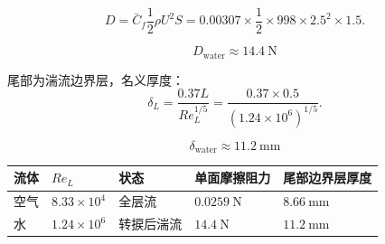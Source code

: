 ﻿\documentclass[11pt,a4paper]{ctexart}
\begin{document}
\[
D=\bar C_f\frac12\rho U^2S
=0.00307\times\frac12\times998\times2.5^2\times1.5.
\]

\[
\boxed{D_{\mathrm{water}}\approx14.4\ \mathrm{N}}
\]

尾部为湍流边界层，名义厚度：
\[
\delta_L=\frac{0.37L}{Re_L^{1/5}}
=\frac{0.37\times0.5}{(1.24\times10^6)^{1/5}}.
\]

\[
\boxed{\delta_{\mathrm{water}}\approx11.2\ \mathrm{mm}}
\]

\begin{center}
\begin{tabular}{lllll}
\toprule
流体 & \(Re_L\) & 状态 & 单面摩擦阻力 & 尾部边界层厚度\\
\midrule
空气 & \(8.33\times10^4\) & 全层流 & \(0.0259\ \mathrm{N}\) & \(8.66\ \mathrm{mm}\)\\
水 & \(1.24\times10^6\) & 转捩后湍流 & \(14.4\ \mathrm{N}\) & \(11.2\ \mathrm{mm}\)\\
\bottomrule
\end{tabular}
\end{center}
\end{document}
